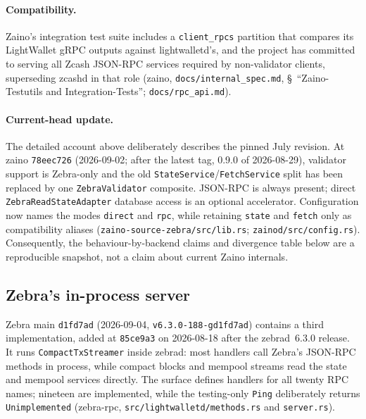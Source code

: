 \documentclass[11pt,a4paper]{article}
\theoremstyle{definition}
\begin{document}
\paragraph{Compatibility.} Zaino's integration test suite includes a
\texttt{client\_rpcs} partition that compares its LightWallet gRPC
outputs against lightwalletd's, and the project has committed to serving
all Zcash JSON-RPC services required by non-validator clients,
superseding zcashd in that role (\textsf{zaino},
\texttt{docs/internal\_spec.md}, \S~``Zaino-Testutils and
Integration-Tests''; \texttt{docs/rpc\_api.md}).

\paragraph{Current-head update.} The detailed account above deliberately
describes the pinned July revision. At \textsf{zaino} \texttt{78eec726}
(2026-09-02; after the latest tag, 0.9.0 of 2026-08-29), validator
support is Zebra-only and the old
\texttt{StateService}\allowbreak/\allowbreak\texttt{FetchService} split has
been replaced by one
\texttt{ZebraValidator} composite. JSON-RPC is always present; direct
\texttt{ZebraReadStateAdapter} database access is an optional accelerator.
Configuration now names the modes \texttt{direct} and \texttt{rpc}, while
retaining \texttt{state} and \texttt{fetch} only as compatibility aliases
(\texttt{zaino-source-zebra/\allowbreak src/\allowbreak lib.rs};
\texttt{zainod/src/config.rs}). Consequently, the behaviour-by-backend claims
and divergence table below are a reproducible snapshot, not a claim about
current Zaino internals.

\subsection{Zebra's in-process server}\label{sec:sync-zebra-grpc}

Zebra main \texttt{d1fd7ad} (2026-09-04,
\texttt{v6.3.0-188-gd1fd7ad}) contains a third implementation, added at
\texttt{85ce9a3} on 2026-08-18 after the zebrad~6.3.0 release. It runs
\texttt{CompactTxStreamer} inside zebrad: most handlers call Zebra's JSON-RPC
methods in process, while compact blocks and mempool streams read the state and
mempool services directly. The surface defines handlers for all twenty RPC
names; nineteen are implemented, while the testing-only \texttt{Ping}
deliberately returns
\texttt{Unimplemented} (\textsf{zebra-rpc},
\texttt{src/lightwalletd/\allowbreak methods.rs} and
\texttt{server.rs}).
\end{document}
